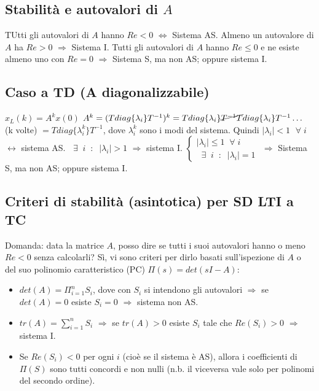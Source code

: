 \subsection*{Stabilità e autovalori di $A$}
TUtti gli autovalori di $A$ hanno $Re <0$ $\Longleftrightarrow$ Sistema AS.\newline
\newline
Almeno un autovalore di $A$ ha $Re > 0$ $\Longrightarrow$ Sistema I.\newline
\newline
Tutti gli autovalori di $A$ hanno $Re \leq 0$ e ne esiste almeno uno con $Re = 0$ $\Longrightarrow$ Sistema S, ma non AS; oppure sistema I.
\subsection*{Caso a TD (A diagonalizzabile)}
$x_L(k) = A^k x(0)$\newline
$A^k = (T diag\{\lambda_i\} T^{-1})^k = T diag\{\lambda_i\}\cancel{T^{-1}T} diag\{\lambda_i\} T^{-1} \dots$ (k volte) $= T diag\{\lambda_i^k\}T^{-1}$, dove $\lambda_i^{k}$ sono i modi del sistema.\newline
\newline
Quindi \newline
$|\lambda_i| < 1$ $\;\forall\;i$ $\longleftrightarrow$ sistema AS.\newline
\newline
$\;\;\exists\;\; i \;\;:\;\; |\lambda_i| > 1$ $\Longrightarrow$ sistema I.\newline
\newline
$\begin{cases}
    |\lambda_i| \leq 1 \;\;\forall\; i\\
    \;\;\exists\;\;i \;\;:\;\;|\lambda_i| = 1 
\end{cases}$ $\Longrightarrow$ Sistema S, ma non AS; oppure sistema I.
\subsection*{Criteri di stabilità (asintotica) per SD LTI a TC}
Domanda: data la matrice $A$, posso dire se tutti i suoi autovalori hanno o meno $Re <0$ senza calcolarli?\newline
\newline
Sì, vi sono criteri per dirlo basati sull'ispezione di $A$ o del suo polinomio caratteristico (PC) $\Pi(s) = det (sI-A)$:
\begin{itemize}
    \item $det(A) = \Pi_{i=1}^{n}S_i$, dove con $S_i$ si intendono gli autovalori $\Longrightarrow$ se $det(A) = 0$ esiste $S_i = 0$ $\Longrightarrow$ sistema non AS.
    \item $tr(A) = \sum_{i=1}^{n}S_i$ $\Longrightarrow$ se $tr(A) >0$ esiste $S_i$ tale che $Re(S_i) > 0$ $\Longrightarrow$ sistema I.
    \item Se $Re(S_i)<0$ per ogni $i$ (cioè se il sistema è AS), allora i coefficienti di $\Pi(S)$ sono tutti concordi e non nulli (n.b. il viceversa vale solo per polinomi del secondo ordine).
\end{itemize}